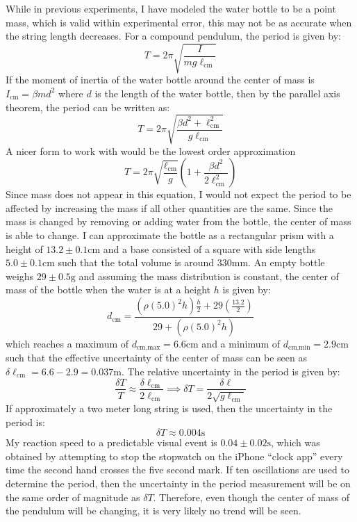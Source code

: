 \documentclass[%
 reprint,
 amsmath,amssymb
 aps,
]{revtex4-2}
\begin{document}
While in previous experiments, I have modeled the water bottle to be a point mass, which is valid within experimental error, this may not be as accurate when the string length decreases. For a compound pendulum, the period is given by:
\begin{equation}
    T = 2\pi\sqrt{\frac{I}{mg\ell_\text{cm}}}
    \label{eq:}
\end{equation}
If the moment of inertia of the water bottle around the center of mass is $I_\text{cm}=\beta m d^2$ where $d$ is the length of the water bottle, then by the parallel axis theorem, the period can be written as:
\begin{equation}
    T = 2\pi\sqrt{\frac{\beta d^2 + \ell_\text{cm}^2}{g\ell_\text{cm}}}
    \label{eq:proper}
\end{equation}
A nicer form to work with would be the lowest order approximation
\begin{equation}
    T = 2\pi\sqrt{\frac{\ell_\text{cm}}{g}}\left(1+\frac{\beta d^2}{2\ell_\text{cm}^2}\right)
    \label{eq:low order}
\end{equation}
Since mass does not appear in this equation, I would not expect the period to be affected by increasing the mass if all other quantities are the same. Since the mass is changed by removing or adding water from the bottle, the center of mass is able to change. I can approximate the bottle as a rectangular prism with a height of $13.2 \pm 0.1 \si{\centi\meter}$ and a base consisted of a square with side lengths $5.0 \pm 0.1 \si{\centi\meter}$ such that the total volume is around $330\si{\milli\meter}$. An empty bottle weighs $29 \pm 0.5 \si{\gram}$ and assuming the mass distribution is constant, the center of mass of the bottle when the water is at a height $h$ is given by:
\begin{equation}
    d_\text{cm} = \frac{\left(\rho(5.0)^2h\right)\frac{h}{2} + 29\left(\frac{13.2}{2}\right)}{29+\left(\rho(5.0)^2h\right)}
    \label{eq:}
\end{equation}
which reaches a maximum of $d_\text{cm,max}=6.6\si{\centi\meter}$ and a minimum of $d_\text{cm,min}=2.9\si{\centi\meter}$ such that the effective uncertainty of the center of mass can be seen as $\delta \ell_\text{cm}=6.6-2.9 = 0.037\si{\meter}$. The relative uncertainty in the period is given by:
\begin{equation}
    \frac{\delta T}{T} \approx \frac{\delta \ell_\text{cm}}{2\ell_\text{cm}} \implies \delta T = \frac{\delta \ell}{2\sqrt{g\ell_\text{cm}}}
    \label{eq:}
\end{equation}
If approximately a two meter long string is used, then the uncertainty in the period is:
\begin{equation}
    \delta T \approx 0.004\si{\second}
    \label{eq:}
\end{equation}
My reaction speed to a predictable visual event is $0.04 \pm 0.02\si{\second}$, which was obtained by attempting to stop the stopwatch on the iPhone ``clock app'' every time the second hand crosses the five second mark. If ten oscillations are used to determine the period, then the uncertainty in the period measurement will be on the same order of magnitude as $\delta T$. Therefore, even though the center of mass of the pendulum will be changing, it is very likely no trend will be seen.
\end{document}
